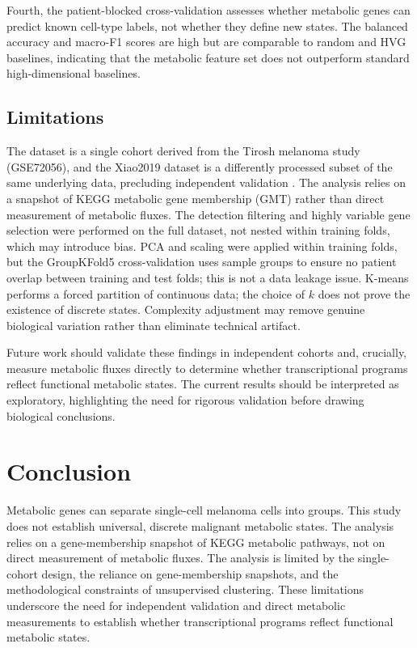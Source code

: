 Fourth, the patient-blocked cross-validation assesses whether metabolic genes can predict known cell-type labels, not whether they define new states. The balanced accuracy and macro-F1 scores are high but are comparable to random and HVG baselines, indicating that the metabolic feature set does not outperform standard high-dimensional baselines.

\subsection{Limitations}

The dataset is a single cohort derived from the Tirosh melanoma study (GSE72056), and the Xiao2019 dataset is a differently processed subset of the same underlying data, precluding independent validation \cite{Tirosh2016,Xiao2019}. The analysis relies on a snapshot of KEGG metabolic gene membership (GMT) rather than direct measurement of metabolic fluxes. The detection filtering and highly variable gene selection were performed on the full dataset, not nested within training folds, which may introduce bias. PCA and scaling were applied within training folds, but the GroupKFold5 cross-validation uses sample groups to ensure no patient overlap between training and test folds; this is not a data leakage issue. K-means performs a forced partition of continuous data; the choice of $k$ does not prove the existence of discrete states. Complexity adjustment may remove genuine biological variation rather than eliminate technical artifact.

Future work should validate these findings in independent cohorts and, crucially, measure metabolic fluxes directly to determine whether transcriptional programs reflect functional metabolic states. The current results should be interpreted as exploratory, highlighting the need for rigorous validation before drawing biological conclusions.

\section{Conclusion}

Metabolic genes can separate single-cell melanoma cells into groups. This study does not establish universal, discrete malignant metabolic states. The analysis relies on a gene-membership snapshot of KEGG metabolic pathways, not on direct measurement of metabolic fluxes. The analysis is limited by the single-cohort design, the reliance on gene-membership snapshots, and the methodological constraints of unsupervised clustering. These limitations underscore the need for independent validation and direct metabolic measurements to establish whether transcriptional programs reflect functional metabolic states.
